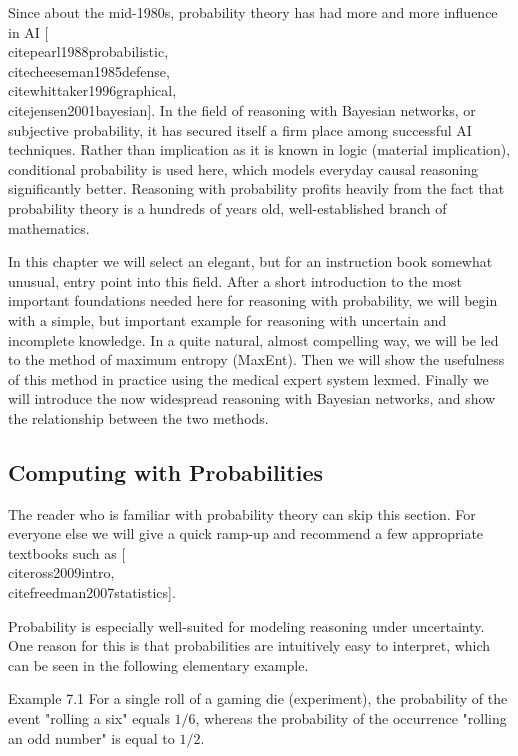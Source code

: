 \documentclass[10pt]{book}
\begin{document}
Since about the mid-1980s, probability theory has had more and more influence in AI [\\cite{pearl1988probabilistic}, \\cite{cheeseman1985defense}, \\cite{whittaker1996graphical}, \\cite{jensen2001bayesian}]. In the field of reasoning with Bayesian networks, or subjective probability, it has secured itself a firm place among successful AI techniques. Rather than implication as it is known in logic (material implication), conditional probability is used here, which models everyday causal reasoning significantly better. Reasoning with probability profits heavily from the fact that probability theory is a hundreds of years old, well-established branch of mathematics.

In this chapter we will select an elegant, but for an instruction book somewhat unusual, entry point into this field. After a short introduction to the most important foundations needed here for reasoning with probability, we will begin with a simple, but important example for reasoning with uncertain and incomplete knowledge. In a quite natural, almost compelling way, we will be led to the method of maximum entropy (MaxEnt). Then we will show the usefulness of this method in practice using the medical expert system lexmed. Finally we will introduce the now widespread reasoning with Bayesian networks, and show the relationship between the two methods.

\subsection*{Computing with Probabilities}
The reader who is familiar with probability theory can skip this section. For everyone else we will give a quick ramp-up and recommend a few appropriate textbooks such as [\\cite{ross2009intro}, \\cite{freedman2007statistics}].

Probability is especially well-suited for modeling reasoning under uncertainty. One reason for this is that probabilities are intuitively easy to interpret, which can be seen in the following elementary example.

Example 7.1 For a single roll of a gaming die (experiment), the probability of the event "rolling a six" equals $1 / 6$, whereas the probability of the occurrence "rolling an odd number" is equal to $1 / 2$.
\end{document}

